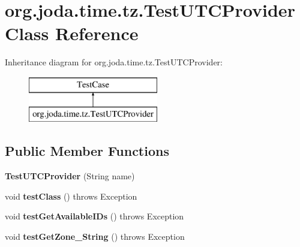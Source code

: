 \hypertarget{classorg_1_1joda_1_1time_1_1tz_1_1_test_u_t_c_provider}{\section{org.\-joda.\-time.\-tz.\-Test\-U\-T\-C\-Provider Class Reference}
\label{classorg_1_1joda_1_1time_1_1tz_1_1_test_u_t_c_provider}
}
Inheritance diagram for org.\-joda.\-time.\-tz.\-Test\-U\-T\-C\-Provider\-:\begin{figure}[H]
\begin{center}
\leavevmode
\includegraphics[height=2.000000cm]{classorg_1_1joda_1_1time_1_1tz_1_1_test_u_t_c_provider}
\end{center}
\end{figure}
\subsection*{Public Member Functions}
\begin{DoxyCompactItemize}
\item 
\hypertarget{classorg_1_1joda_1_1time_1_1tz_1_1_test_u_t_c_provider_a18d873305775aabdcbae645dec9f1d9b}{{\bfseries Test\-U\-T\-C\-Provider} (String name)}\label{classorg_1_1joda_1_1time_1_1tz_1_1_test_u_t_c_provider_a18d873305775aabdcbae645dec9f1d9b}

\item 
\hypertarget{classorg_1_1joda_1_1time_1_1tz_1_1_test_u_t_c_provider_a4ce1862500382c14272f21eb228fbfd7}{void {\bfseries test\-Class} ()  throws Exception }\label{classorg_1_1joda_1_1time_1_1tz_1_1_test_u_t_c_provider_a4ce1862500382c14272f21eb228fbfd7}

\item 
\hypertarget{classorg_1_1joda_1_1time_1_1tz_1_1_test_u_t_c_provider_a40f8d088207aed4009a2eb6266da50fa}{void {\bfseries test\-Get\-Available\-I\-Ds} ()  throws Exception }\label{classorg_1_1joda_1_1time_1_1tz_1_1_test_u_t_c_provider_a40f8d088207aed4009a2eb6266da50fa}

\item 
\hypertarget{classorg_1_1joda_1_1time_1_1tz_1_1_test_u_t_c_provider_a57b45f9c49f82a566f1f9a65377d1308}{void {\bfseries test\-Get\-Zone\-\_\-\-String} ()  throws Exception }\label{classorg_1_1joda_1_1time_1_1tz_1_1_test_u_t_c_provider_a57b45f9c49f82a566f1f9a65377d1308}

\end{DoxyCompactItemize}
